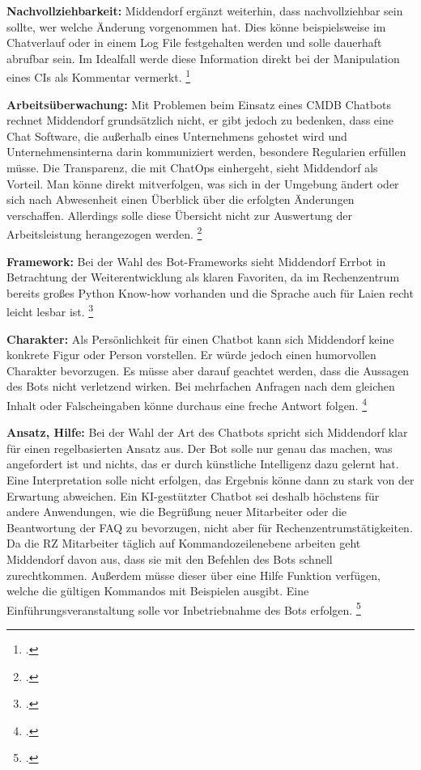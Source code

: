 \textbf{Nachvollziehbarkeit: }Middendorf ergänzt weiterhin, dass nachvollziehbar sein sollte, wer welche Änderung vorgenommen hat. Dies könne beispielsweise im Chatverlauf oder in einem Log File festgehalten werden und solle dauerhaft abrufbar sein. Im Idealfall werde diese Information direkt bei der Manipulation eines \acs{CI}s als Kommentar vermerkt.
\footcite[Vgl.][o. \pno]{Midd_2019}

\textbf{Arbeitsüberwachung: }Mit Problemen beim Einsatz eines \acs{CMDB} Chatbots rechnet Middendorf grundsätzlich nicht, er gibt jedoch zu bedenken, dass eine Chat Software, die außerhalb eines Unternehmens gehostet wird und Unternehmensinterna darin kommuniziert werden, besondere Regularien erfüllen müsse. Die Transparenz, die mit ChatOps einhergeht, sieht Middendorf als Vorteil. Man könne direkt mitverfolgen, was sich in der Umgebung ändert oder sich nach Abwesenheit einen Überblick über die erfolgten Änderungen verschaffen. Allerdings solle diese Übersicht nicht zur Auswertung der Arbeitsleistung herangezogen werden.
\footcite[Vgl.][o. \pno]{Midd_2019}

\textbf{Framework: }Bei der Wahl des Bot-Frameworks sieht Middendorf Errbot in Betrachtung der Weiterentwicklung als klaren Favoriten, da im Rechenzentrum bereits großes Python Know-how vorhanden und die Sprache auch für Laien recht leicht lesbar ist.
\footcite[Vgl.][o. \pno]{Midd_2019}

\textbf{Charakter: }Als Persönlichkeit für einen Chatbot kann sich Middendorf keine konkrete Figur oder Person vorstellen. Er würde jedoch einen humorvollen Charakter bevorzugen. Es müsse aber darauf geachtet werden, dass die Aussagen des Bots nicht verletzend wirken. Bei mehrfachen Anfragen nach dem gleichen Inhalt oder Falscheingaben könne durchaus eine freche Antwort folgen. 
\footcite[Vgl.][o. \pno]{Midd_2019}

\textbf{Ansatz, Hilfe: } Bei der Wahl der Art des Chatbots spricht sich Middendorf klar für einen regelbasierten Ansatz aus. Der Bot solle nur genau das machen, was angefordert ist und nichts, das er durch künstliche Intelligenz dazu gelernt hat. Eine Interpretation solle nicht erfolgen, das Ergebnis könne dann zu stark von der Erwartung abweichen. Ein KI-gestützter Chatbot sei deshalb höchstens für andere Anwendungen, wie die Begrüßung neuer Mitarbeiter oder die Beantwortung der FAQ zu bevorzugen, nicht aber für Rechenzentrumstätigkeiten.\\
Da die RZ Mitarbeiter täglich auf Kommandozeilenebene arbeiten geht Middendorf davon aus, dass sie mit den Befehlen des Bots schnell zurechtkommen. Außerdem müsse dieser über eine Hilfe Funktion verfügen, welche die gültigen Kommandos mit Beispielen ausgibt.  Eine Einführungsveranstaltung solle vor Inbetriebnahme des Bots erfolgen.
\footcite[Vgl.][o. \pno]{Midd_2019}

